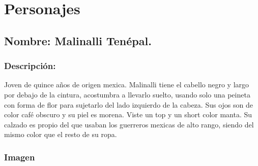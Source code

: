 \documentclass[11pt,letterpaper]{article}
\begin{document}
\section{Personajes}

\subsection{Nombre: Malinalli Tenépal.} \label{per.malinalli}
	\subsubsection{Descripción:}
Joven de quince años de origen mexica. Malinalli tiene el cabello negro y largo por debajo de la cintura, acostumbra a llevarlo suelto, usando solo una peineta con forma de flor para sujetarlo del lado izquierdo de la cabeza. Sus ojos son de color café obscuro y su piel es morena. Viste un top y un short color manta. Su calzado es propio del que usaban los guerreros mexicas de alto rango, siendo del mismo color que el resto de su ropa.   
\subsubsection{Imagen}
\end{document}
